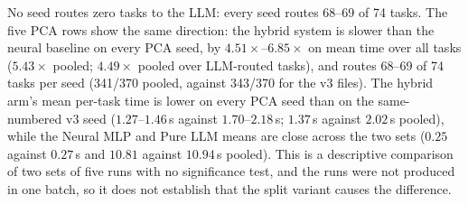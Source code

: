 \documentclass[twoside,11pt]{article}
\begin{document}
No seed routes zero tasks to the LLM: every seed routes 68--69 of 74 tasks.
The five PCA rows show the same direction: the hybrid system is slower than the neural
baseline on every PCA seed, by $4.51\times$--$6.85\times$ on mean time over all tasks
($5.43\times$ pooled; $4.49\times$ pooled over LLM-routed tasks), and routes 68--69 of 74
tasks per seed (341/370 pooled, against 343/370 for the v3 files). The hybrid arm's mean
per-task time is lower on every PCA seed than on the same-numbered v3 seed ($1.27$--$1.46$\,s
against $1.70$--$2.18$\,s; $1.37$\,s against $2.02$\,s pooled), while the Neural MLP and
Pure LLM means are close across the two sets ($0.25$ against $0.27$\,s and $10.81$ against
$10.94$\,s pooled). This is a descriptive comparison of two sets of five runs with no
significance test, and the runs were not produced in one batch, so it does not establish
that the split variant causes the difference.
\end{document}
